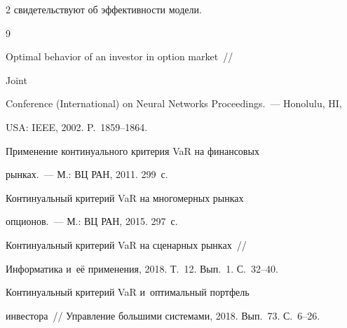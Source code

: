 \begin{multicols}{2}
свидетельствуют об эффективности модели.










\vspace*{-6pt} 


  


{\small\frenchspacing


 {%




 \begin{thebibliography}{9}




   Optimal behavior of an investor in option market~// 


  Joint 


Conference (International) on Neural Networks Proceedings.~--- Honolulu, HI,


USA:  IEEE,  2002. P.~1859--1864. 




   Применение континуального критерия VaR на финансовых 


рынках.~--- М.: ВЦ РАН, 2011. 299~с. 




   Континуальный критерий VaR на многомерных рынках  


опционов.~--- М.: ВЦ РАН, 2015. 297~с. 




   Континуальный критерий VaR на сценарных рынках~// 


Информатика и~её применения, 2018. Т.~12. Вып.~1. С.~32--40.





 




   Континуальный критерий VaR и~оптимальный портфель 


инвестора~// Управ\-ле\-ние большими сис\-те\-ма\-ми, 2018. Вып.~73. С.~6--26.





\columnbreak






\end{thebibliography}}}
\end{multicols}
